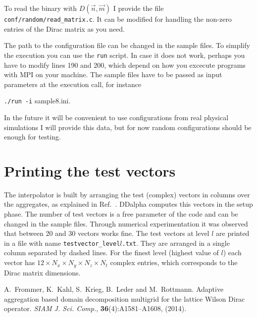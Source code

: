 \documentclass[a4paper,12pt]{scrartcl}
\begin{document}
To read the binary with $D(\vec{n},\vec{m})$ I provide the file \texttt{conf/random/read\_matrix.c}. It can be modified for handling the non-zero entries of the Dirac matrix as you need.

\hspace{2mm}
 
The path to the configuration file can be changed in the sample files. To simplify the execution you can use the \texttt{run} script. In case it does not work, perhaps you have to modify lines 190 and 200, which depend on how you excecute programs with MPI on your machine. The sample files have to be passed as input parameters at the execution call, for instance \begin{center}

\texttt{./run -i} sample8.ini.                                                                                                                                                                                                                                                            \end{center}


In the future it will be convenient to use configurations from real physical simulations I will provide this data, but for now random configurations should be enough for testing.


\section{Printing the test vectors}
The interpolator is built by arranging the test (complex) vectors in columns over the aggregates, as explained in Ref.\ \cite{Frommer}. DDalpha computes this vectors in the setup phase. The number of test vectors is a free parameter of the code and can be changed in the sample files. Through numerical experimentation it was observed that between 20 and 30 vectors works fine. The test vectors at level $l$ are printed in a file with name \texttt{testvector\_level$l$.txt}. They are arranged in a single column separated by dashed lines. For the finest level (highest value of $l$) each vector has $12\times N_x\times N_y\times N_z\times N_t$ complex entries, which corresponds to the Dirac matrix dimensions.





\begin{thebibliography}{X}
A.\ Frommer, K.\ Kahl, S.\ Krieg, B.\ Leder and M.\ Rottmann. Adaptive aggregation based domain decomposition multigrid for the lattice Wilson Dirac operator. \textit{SIAM J. Sci. Comp.}, \textbf{36}(4):A1581--A1608, (2014).
\end{thebibliography}
\end{document}
